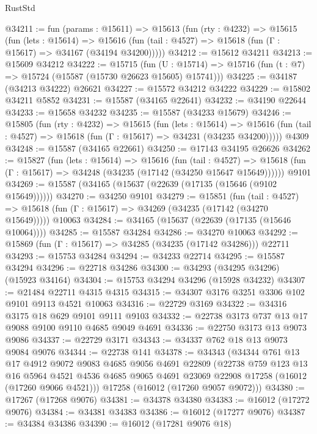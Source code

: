 \begin{lexlean}{RustStd}
\begin{coremodule}
@34211 := fun (params : @15611) =>
  @15613
    (fun (rty : @4232) =>
    @15615
      (fun (lets : @15614) =>
      @15616 (fun (tail : @4527) => @15618 (fun (Γ : @15617) => @34167 (@34194 @34200)))))
@34212 := @15612 @34211
@34213 := @15609 @34212
@34222 := @15715
    (fun (U : @15714) => @15716 (fun (t : @7) => @15724 (@15587 (@15730 @26623 @15605) @15741)))
@34225 := @34187 (@34213 @34222) @26621
@34227 := @15572 @34212 @34222
@34229 := @15802 @34211 @5852
@34231 := @15587 (@34165 @22641)
@34232 := @34190 @22644
@34233 := @15658 @34232
@34235 := @15587 (@34233 @15679)
@34246 := @15805
    (fun (rty : @4232) =>
    @15615
      (fun (lets : @15614) =>
      @15616 (fun (tail : @4527) => @15618 (fun (Γ : @15617) => @34231 (@34235 @34200)))))
    @4309
@34248 := @15587 (@34165 @22661)
@34250 := @17143 @34195 @26626
@34262 := @15827
    (fun (lets : @15614) =>
    @15616
      (fun (tail : @4527) =>
      @15618 (fun (Γ : @15617) => @34248 (@34235 (@17142 (@34250 @15647 @15649))))))
    @9101
@34269 := @15587 (@34165 (@15637 (@22639 (@17135 (@15646 (@9102 @15649))))))
@34270 := @34250 @9101
@34279 := @15851
    (fun (tail : @4527) => @15618 (fun (Γ : @15617) => @34269 (@34235 (@17142 (@34270 @15649)))))
    @10063
@34284 := @34165 (@15637 (@22639 (@17135 (@15646 @10064))))
@34285 := @15587 @34284
@34286 := @34270 @10063
@34292 := @15869 (fun (Γ : @15617) => @34285 (@34235 (@17142 @34286))) @22711
@34293 := @15753 @34284
@34294 := @34233 @22714
@34295 := @15587 @34294
@34296 := @22718 @34286
@34300 := @34293 (@34295 @34296) (@15923 @34164)
@34304 := @15753 @34294 @34296 (@15928 @34232)
@34307 := @21484 @22711 @4315 @4315
@34315 := @34307 @3176 @3251 @3306 @102 @9101 @9113 @4521 @10063
@34316 := @22729 @3169
@34322 := @34316 @3175 @18 @629 @9101 @9111 @9103
@34332 := @22738 @3173 @737 @13 @17 @9088 @9100 @9110 @4685 @9049 @4691
@34336 := @22750 @3173 @13 @9073 @9086
@34337 := @22729 @3171
@34343 := @34337 @762 @18 @13 @9073 @9084 @9076
@34344 := @22738 @141
@34378 := @34343
    (@34344
      @761
      @13
      @17
      @4912
      @9072
      @9083
      @4685
      @9056
      @4691
      @22809
      (@22738
        @759
        @123
        @13
        @16
        @5964
        @4521
        @4536
        @4685
        @9065
        @4691
        @23069
        @22908
        @17258
        (@16012 (@17260 @9066 @4521)))
      @17258
      (@16012 (@17260 @9057 @9072)))
@34380 := @17267 (@17268 @9076)
@34381 := @34378 @34380
@34383 := @16012 (@17272 @9076)
@34384 := @34381 @34383
@34386 := @16012 (@17277 @9076)
@34387 := @34384 @34386
@34390 := @16012 (@17281 @9076 @18)

\end{coremodule}
\end{lexlean}
